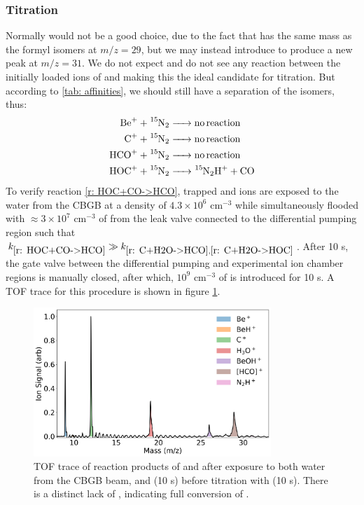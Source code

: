 \subsubsection{ Titration}

Normally  would not be a good choice, due to the fact that  has the same mass as the formyl isomers at $m/z=29$, but we may instead introduce  to produce a new peak at $m/z=31$. We do not expect and do not see any reaction between the initially loaded ions of  and  making this the ideal candidate for titration. But according to \cref{tab: affinities}, we should still have a separation of the isomers, thus:
\begin{align}
\ce{Be+ + ^15N2 & -> no reaction} \nonumber \\
\ce{C+ + ^15N2 & -> no reaction} \nonumber \\
\ce{HCO+ + ^15N2 & -> no reaction} \label{r: HCO+N2->NA} \\
\ce{HOC+ + ^15N2 & -> ^15N2H+ + CO} \label{r: HOC+N2->N2H}
\end{align}
To verify reaction \ref{r: HOC+CO->HCO}, trapped  and  ions are exposed to the water from the CBGB at a density of $4.3 \times 10^6$ cm$^{-3}$ while simultaneously flooded with $\approx 3 \times 10^7$ cm$^{-3}$ of  from the leak valve connected to the differential pumping region such that $k_{\ref{r: HOC+CO->HCO}} \gg k_{\ref{r: C+H2O->HCO}, \ref{r: C+H2O->HOC}}$. After 10 s, the gate valve between the differential pumping and experimental ion chamber regions is manually closed, after which, $10^9$ cm$^{-3}$ of  is introduced for 10 s. A TOF trace for this procedure is shown in figure \ref{fig: CO N2 TOF}.

\begin{figure}[H]
	\centering
	\includegraphics[width=0.8\textwidth]{images/C_H2O_CO_15N2.png}
	\caption{TOF trace of reaction products of  and  after exposure to both water from the CBGB beam, and  (10 s) before titration with  (10 s). There is a distinct lack of , indicating full conversion of .}
	\label{fig: CO N2 TOF}
\end{figure}

